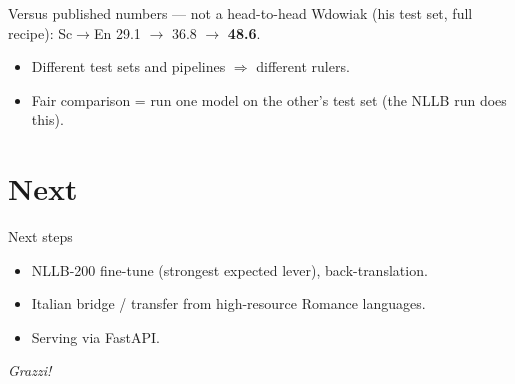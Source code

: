 \documentclass{beamer}
\begin{document}
\begin{frame}{Versus published numbers --- not a head-to-head}
  Wdowiak (his test set, full recipe): Sc$\rightarrow$En 29.1 $\to$ 36.8 $\to$ \textbf{48.6}.
  \begin{itemize}
    \item Different test sets and pipelines $\Rightarrow$ different rulers.
    \item Fair comparison = run one model on the other's test set (the NLLB run does this).
  \end{itemize}
\end{frame}

\section{Next}
\begin{frame}{Next steps}
  \begin{itemize}
    \item NLLB-200 fine-tune (strongest expected lever), back-translation.
    \item Italian bridge / transfer from high-resource Romance languages.
    \item Serving via FastAPI.
  \end{itemize}
  \centering \vspace{1em} \emph{Grazzi!}
\end{frame}



\end{document}
